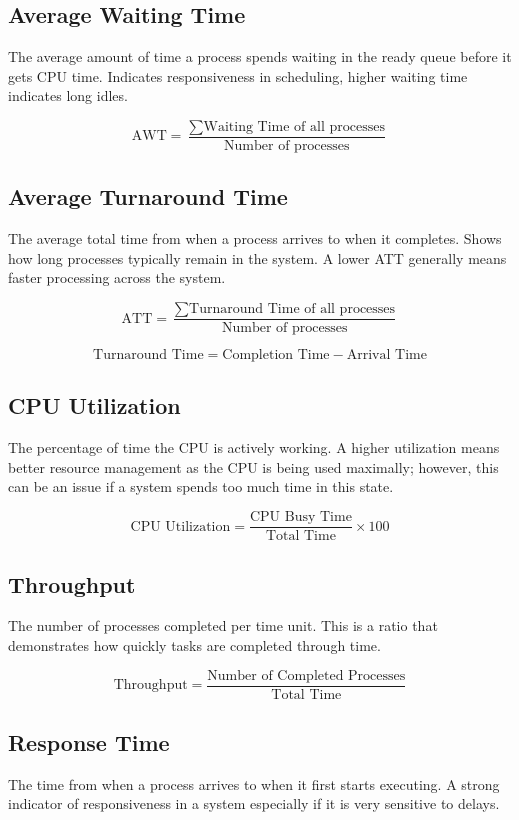 \documentclass[conference]{report}
\begin{document}
\subsection*{Average Waiting Time}
The average amount of time a process spends waiting in the ready queue before it gets CPU time. Indicates responsiveness in scheduling, higher waiting time indicates long idles.

\[
\text{AWT} = \frac{\sum \text{Waiting Time of all processes}}{\text{Number of processes}}
\]

\subsection*{Average Turnaround Time}
The average total time from when a process arrives to when it completes. Shows how long processes typically remain in the system. A lower ATT generally means faster processing across the system.

\[
\text{ATT} = \frac{\sum \text{Turnaround Time of all processes}}{\text{Number of processes}}
\]

\[
\text{Turnaround Time} = \text{Completion Time} - \text{Arrival Time}
\]

\subsection*{CPU Utilization}
The percentage of time the CPU is actively working. A higher utilization means better resource management as the CPU is being used maximally; however, this can be an issue if a system spends too much time in this state.

\[
\text{CPU Utilization} = \frac{\text{CPU Busy Time}}{\text{Total Time}} \times 100
\]

\subsection*{Throughput}
The number of processes completed per time unit. This is a ratio that demonstrates how quickly tasks are completed through time.

\[
\text{Throughput} = \frac{\text{Number of Completed Processes}}{\text{Total Time}}
\]

\subsection*{Response Time}
The time from when a process arrives to when it first starts executing. A strong indicator of responsiveness in a system especially if it is very sensitive to delays.
\end{document}
